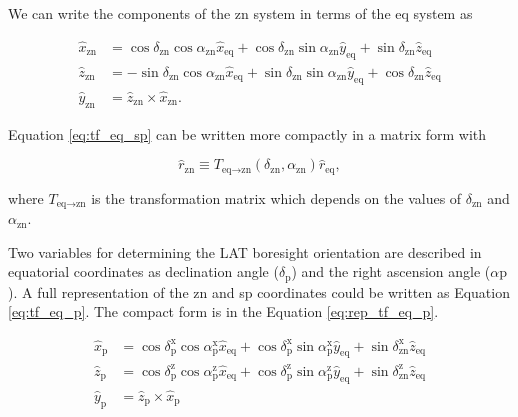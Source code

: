 We can write the components of the zn system in terms of the eq system as

\begin{equation}
    \begin{split}
    \hat{x}_\text{zn} &= \cos\delta_\text{zn}\cos\alpha_\text{zn}\hat{x}_\text{eq} + \cos\delta_\text{zn}\sin\alpha_\text{zn}\hat{y}_\text{eq} + \sin\delta_\text{zn}\hat{z}_\text{eq}\\
    \hat{z}_\text{zn} &= - \sin\delta_\text{zn}\cos\alpha_\text{zn}\hat{x}_\text{eq} + \sin\delta_\text{zn}\sin\alpha_\text{zn}\hat{y}_\text{eq} + \cos\delta_\text{zn}\hat{z}_\text{eq} \\
    \hat{y}_\text{zn} &= \hat{z}_\text{zn} \times \hat{x}_\text{zn}.
    \end{split}
    \label{eq:tf_eq_sp}
\end{equation}

Equation \ref{eq:tf_eq_sp} can be written more
compactly in a matrix form with

\begin{equation}
    \hat{r}_\text{zn} \equiv T_{\text{eq}\rightarrow\text{zn}} (\delta_\text{zn}, \alpha_\text{zn}) \hat{r}_\text{eq},
    \label{eq:rep_tf_eq_sp}
\end{equation}

where $T_{\text{eq}\rightarrow\text{zn}}$ is the transformation matrix which depends on the
values of $\delta_\text{zn}$ and $\alpha_\text{zn}$.


Two variables for determining the LAT boresight
orientation are described 
in equatorial coordinates as declination angle ($\delta_\text{p}$)
and the right ascension angle ($\alpha\text{p}$).
A full representation of the zn and sp coordinates could
be written as Equation \ref{eq:tf_eq_p}.
The compact form is in the Equation \ref{eq:rep_tf_eq_p}.

\begin{equation}
    \begin{split}
    \hat{x}_\text{p} &= \cos\delta^\text{x}_\text{p}\cos\alpha^\text{x}_\text{p}\hat{x}_\text{eq} + \cos\delta^\text{x}_\text{p}\sin\alpha^\text{x}_\text{p}\hat{y}_\text{eq} + \sin\delta^\text{x}_\text{zn}\hat{z}_\text{eq}\\
    \hat{z}_\text{p} &= \cos\delta^\text{z}_\text{p}\cos\alpha^\text{z}_\text{p}\hat{x}_\text{eq} + \cos\delta^\text{z}_\text{p}\sin\alpha^\text{z}_\text{p}\hat{y}_\text{eq} + \sin\delta^\text{z}_\text{zn}\hat{z}_\text{eq}\\
    \hat{y}_\text{p} &= \hat{z}_\text{p} \times \hat{x}_\text{p}
    \end{split}
    \label{eq:tf_eq_p}
\end{equation}

